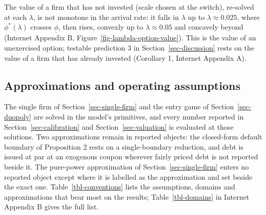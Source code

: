 \documentclass[
  11pt,
  letterpaper,
]{scrartcl}
\begin{document}
The value of a firm that has not invested (scale chosen at the switch),
re-solved at each \(\lambda\), is not monotone in the arrival rate: it
falls in \(\lambda\) up to \(\lambda \approx 0.025\), where
\(\phi^*(\lambda)\) crosses \(\underline{\phi}\), then rises, convexly
up to \(\lambda \approx 0.05\) and concavely beyond (Internet Appendix
B, Figure~\ref{fig-lambda-option-value}). This is the value of an
unexercised option; testable prediction 3 in
Section~\ref{sec-discussion} rests on the value of a firm that has
already invested (Corollary 1, Internet Appendix A).

\subsection{Approximations and operating
assumptions}\label{sec-conventions}

The single firm of Section~\ref{sec-single-firm} and the entry game of
Section~\ref{sec-duopoly} are solved in the model's primitives, and
every number reported in Section~\ref{sec-calibration} and
Section~\ref{sec-valuation} is evaluated at those solutions. Two
approximations remain in reported objects: the closed-form default
boundary of Proposition 2 rests on a single-boundary reduction, and debt
is issued at par at an exogenous coupon wherever fairly priced debt is
not reported beside it. The pure-power approximation of
Section~\ref{sec-single-firm} enters no reported object except where it
is labelled as the approximation and set beside the exact one.
Table~\ref{tbl-conventions} lists the assumptions, domains and
approximations that bear most on the results; Table~\ref{tbl-domains} in
Internet Appendix B gives the full list.

\begingroup{}
\end{document}
